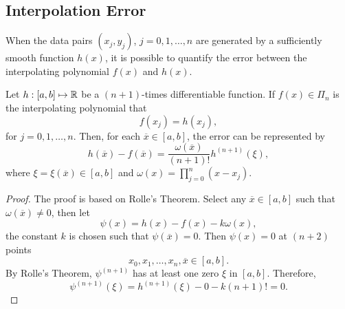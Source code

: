 \subsection{Interpolation Error}
\label{SSec: 2-Int-Err}
When the data pairs $(x_j, y_j)$, $j=0,1,\dots, n$ are generated by a sufficiently smooth function $h(x)$, it is possible to quantify the error between the interpolating polynomial $f(x)$ and $h(x)$. 
\begin{theorem}
\label{Thm: 2-Int-err}
    Let $h: [a, b]\mapsto \mathbb R$ be a $(n+1)$-times differentiable function. If $f(x)\in\Pi_n$ is the interpolating polynomial that 
    $$f(x_j) = h(x_j),$$
    for $j=0,1,\dots, n$. Then, for each $\overline{x}\in [a, b]$, the error can be represented by 
    \begin{equation}
        h(\overline{x}) - f(\overline{x}) = \frac{\omega(\overline{x})}{(n+1)!} h^{(n+1)}(\xi),
    \end{equation}
    where $\xi = \xi(\overline{x})\in [a, b]$ and $\omega(x) = \prod_{j=0}^n (x - x_j)$.
\end{theorem}
\begin{proof}
    The proof is based on Rolle's Theorem. Select any $\overline{x}\in[a, b]$ such that $\omega(\overline{x})\neq 0$, then let 
    $$\psi(x) = h(x) - f(x) - k\omega (x),$$
    the constant $k$ is chosen such that $\psi(\overline{x}) = 0$. Then $\psi(x) = 0$ at $(n+2)$ points 
    $$x_0, x_1, \dots, x_n, \overline{x}\in [a, b].$$
    By Rolle's Theorem, $\psi^{(n+1)}$ has at least one zero $\xi$ in $[a,b]$. Therefore,
    \begin{equation}
        \psi^{(n+1)}(\xi) = h^{(n+1)}(\xi) - 0 - k(n+1)! = 0.
    \end{equation}
\end{proof}


